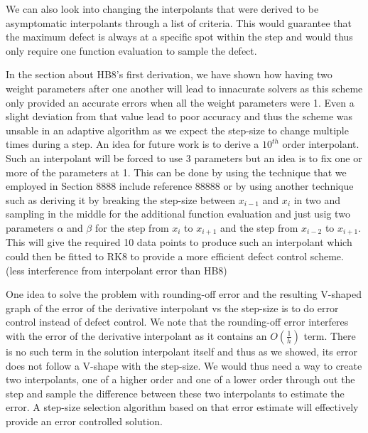 \documentclass{article}
\begin{document}
We can also look into changing the interpolants that were derived to be asymptomatic interpolants through a list of criteria. This would guarantee that the maximum defect is always at a specific spot within the step and would thus only require one function evaluation to sample the defect.

In the section about HB8's first derivation, we have shown how having two weight parameters after one another will lead to innacurate solvers as this scheme only provided an accurate errors when all the weight parameters were 1. Even a slight deviation from that value lead to poor accuracy and thus the scheme was unsable in an adaptive algorithm as we expect the step-size to change multiple times during a step. An idea for future work is to derive a $10^{th}$ order interpolant. Such an interpolant will be forced to use 3 parameters but an idea is to fix one or more of the parameters at 1. This can be done by using the technique that we employed in Section 8888 include reference 88888 or by using another technique such as deriving it by breaking the step-size between $x_{i-1}$ and $x_i$ in two and sampling in the middle for the additional function evaluation and just usig two parameters $\alpha$ and $\beta$ for the step from $x_i$ to $x_{i+1}$ and the step from $x_{i-2}$ to $x_{i+1}$.  This will give the required 10 data points to produce such an interpolant which could then be fitted to RK8 to provide a more efficient defect control scheme. (less interference from interpolant error than HB8) 

One idea to solve the problem with rounding-off error and the resulting V-shaped graph of the error of the derivative interpolant vs the step-size is to do error control instead of defect control. We note that the rounding-off error interferes with the error of the derivative interpolant as it contains an $O(\frac{1}{h})$ term. There is no such term in the solution interpolant itself and thus as we showed, its error does not follow a V-shape with the step-size. We would thus need a way to create two interpolants, one of a higher order and one of a lower order through out the step and sample the difference between these two interpolants to estimate the error. A step-size selection algorithm based on that error estimate will effectively provide an error controlled solution.
\end{document}
